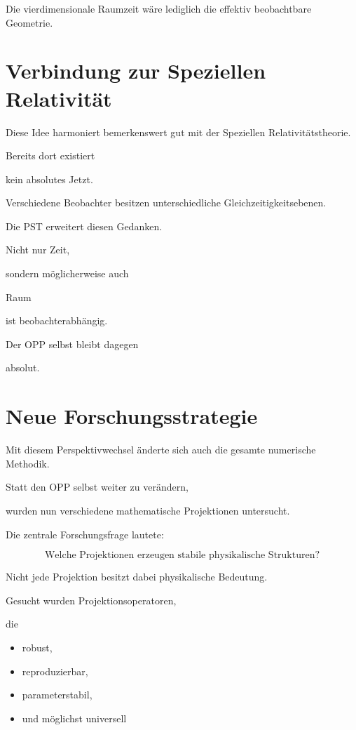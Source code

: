 Die vierdimensionale Raumzeit wäre lediglich die effektiv beobachtbare Geometrie.


\section*{Verbindung zur Speziellen Relativität}

Diese Idee harmoniert bemerkenswert gut mit der Speziellen Relativitätstheorie.

Bereits dort existiert

kein absolutes Jetzt.

Verschiedene Beobachter besitzen unterschiedliche Gleichzeitigkeitsebenen.

Die PST erweitert diesen Gedanken.

Nicht nur Zeit,

sondern möglicherweise auch

Raum

ist beobachterabhängig.

Der OPP selbst bleibt dagegen

absolut.


\section*{Neue Forschungsstrategie}

Mit diesem Perspektivwechsel änderte sich auch die gesamte numerische Methodik.

Statt den OPP selbst weiter zu verändern,

wurden nun verschiedene mathematische Projektionen untersucht.

Die zentrale Forschungsfrage lautete:

\[
\boxed{
\text{Welche Projektionen erzeugen stabile physikalische Strukturen?}
}
\]

Nicht jede Projektion besitzt dabei physikalische Bedeutung.

Gesucht wurden Projektionsoperatoren,

die

\begin{itemize}

\item

robust,

\item

reproduzierbar,

\item

parameterstabil,

\item

und möglichst universell

\end{itemize}

